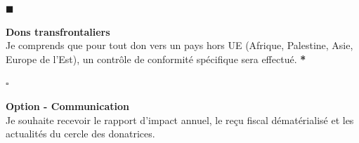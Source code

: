 \documentclass[12pt, a4paper]{article}
\newcommand{\checkSquare}{\textcolor{ethicGold}{\textbf{$\square$}}}
\newcommand{\checkSquareFilled}{\textcolor{ethicGold}{\textbf{$\blacksquare$}}}
\newcommand{\required}{\textcolor{redalert}{\textbf{*}}}
\begin{document}
\begin{sectionbox}
    \vspace{0.3cm}
    
    \noindent
    \begin{minipage}[t]{0.05\textwidth}
        \checkSquareFilled
    \end{minipage}%
    \begin{minipage}[t]{0.93\textwidth}
        \textbf{Dons transfrontaliers} \\
        Je comprends que pour tout don vers un pays hors UE (Afrique, Palestine, Asie, Europe de l'Est), un contrôle de conformité spécifique sera effectué. \required
    \end{minipage}
    
    \vspace{0.3cm}
    
    \noindent
    \begin{minipage}[t]{0.05\textwidth}
        \checkSquare
    \end{minipage}%
    \begin{minipage}[t]{0.93\textwidth}
        \textbf{Option - Communication} \\
        Je souhaite recevoir le rapport d'impact annuel, le reçu fiscal dématérialisé et les actualités du cercle des donatrices.
    \end{minipage}
\end{sectionbox}

\vspace{0.5cm}
\end{document}

